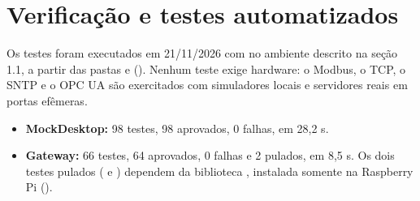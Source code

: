 \section{Verificação e testes automatizados}

Os testes foram executados em 21/11/2026 com  no ambiente descrito na seção 1.1, a partir das pastas  e  (). Nenhum teste exige hardware: o Modbus, o TCP, o SNTP e o OPC UA são exercitados com simuladores locais e servidores reais em portas efêmeras.

\begin{itemize}
    \item \textbf{MockDesktop:} 98 testes, 98 aprovados, 0 falhas, em 28,2 s.
    \item \textbf{Gateway:} 66 testes, 64 aprovados, 0 falhas e 2 pulados, em 8,5 s. Os dois testes pulados ( e ) dependem da biblioteca , instalada somente na Raspberry Pi ().
\end{itemize}


